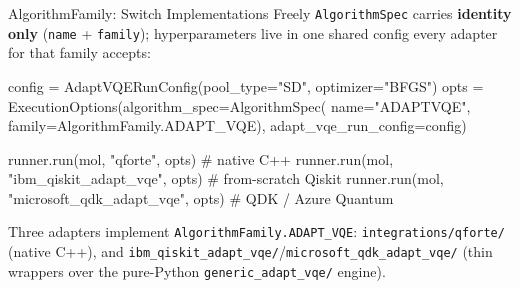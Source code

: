 \documentclass[
  ignorenonframetext,
  aspectratio=169,
]{beamer}
\newenvironment{Shaded}{\begin{snugshade}}{\end{snugshade}}
\newcommand{\CommentTok}[1]{\textcolor[rgb]{0.48,0.49,0.49}{#1}}
\newcommand{\NormalTok}[1]{\textcolor[rgb]{0.81,0.81,0.76}{#1}}
\newcommand{\OperatorTok}[1]{\textcolor[rgb]{0.81,0.81,0.76}{#1}}
\newcommand{\StringTok}[1]{\textcolor[rgb]{0.96,0.31,0.31}{#1}}
\begin{document}
\begin{frame}[fragile]{AlgorithmFamily: Switch Implementations Freely}
\label{algorithmfamily-switch-implementations-freely}
\texttt{AlgorithmSpec} carries \textbf{identity only} (\texttt{name} +
\texttt{family}); hyperparameters live in one shared config every
adapter for that family accepts:

\footnotesize

\begin{Shaded}
\begin{Highlighting}[]
\NormalTok{config }\OperatorTok{=}\NormalTok{ AdaptVQERunConfig(pool\_type}\OperatorTok{=}\StringTok{"SD"}\NormalTok{, optimizer}\OperatorTok{=}\StringTok{"BFGS"}\NormalTok{)}
\NormalTok{opts }\OperatorTok{=}\NormalTok{ ExecutionOptions(algorithm\_spec}\OperatorTok{=}\NormalTok{AlgorithmSpec(}
\NormalTok{    name}\OperatorTok{=}\StringTok{"ADAPTVQE"}\NormalTok{, family}\OperatorTok{=}\NormalTok{AlgorithmFamily.ADAPT\_VQE),}
\NormalTok{    adapt\_vqe\_run\_config}\OperatorTok{=}\NormalTok{config)}

\NormalTok{runner.run(mol, }\StringTok{"qforte"}\NormalTok{, opts)                  }\CommentTok{\# native C++}
\NormalTok{runner.run(mol, }\StringTok{"ibm\_qiskit\_adapt\_vqe"}\NormalTok{, opts)     }\CommentTok{\# from{-}scratch Qiskit}
\NormalTok{runner.run(mol, }\StringTok{"microsoft\_qdk\_adapt\_vqe"}\NormalTok{, opts)  }\CommentTok{\# QDK / Azure Quantum}
\end{Highlighting}
\end{Shaded}

Three adapters implement \texttt{AlgorithmFamily.ADAPT\_VQE}:
\texttt{integrations/qforte/} (native C++), and
\texttt{ibm\_qiskit\_adapt\_vqe/}/\texttt{microsoft\_qdk\_adapt\_vqe/}
(thin wrappers over the pure-Python \texttt{generic\_adapt\_vqe/}
engine). \normalsize
\end{frame}
\end{document}
